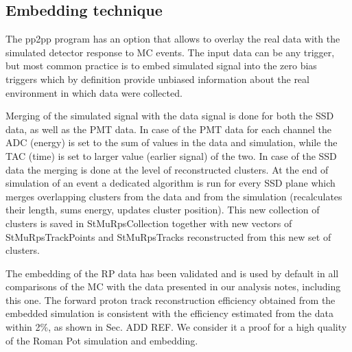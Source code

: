 
\subsection{Embedding technique}

The pp2pp program has an option that allows to overlay the real data with the simulated detector response to MC events. The input data can be any trigger, but most common practice is to embed simulated signal into the zero bias triggers which by definition provide unbiased information about the real environment in which data were collected.

Merging of the simulated signal with the data signal is done for both the SSD data, as well as the PMT data. In case of the PMT data for each channel the ADC (energy) is set to the sum of values in the data and simulation, while the TAC (time) is set to larger value (earlier signal) of the two. In case of the SSD data the merging is done at the level of reconstructed clusters. At the end of simulation of an event a dedicated algorithm is run for every SSD plane which merges overlapping clusters from the data and from the simulation (recalculates their length, sums energy, updates cluster position). This new collection of clusters is saved in StMuRpsCollection together with new vectors of StMuRpsTrackPoints and StMuRpsTracks reconstructed from this new set of clusters.

The embedding of the RP data has been validated and is used by default in all comparisons of the MC with the data presented in our analysis notes, including this one. The forward proton track reconstruction efficiency obtained from the embedded simulation is consistent with the efficiency estimated from the data within 2\%, as shown in Sec. ADD REF. We consider it a proof for a high quality of the Roman Pot simulation and embedding.